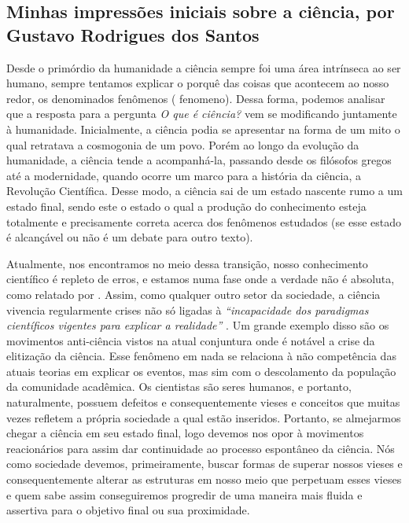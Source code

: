 \subsection{Minhas impressões iniciais sobre a ciência, por Gustavo Rodrigues dos Santos}

Desde o primórdio da humanidade a ciência sempre foi uma área intrínseca ao ser humano, sempre tentamos explicar o porquê das coisas que acontecem ao nosso redor, os denominados fenômenos ( \gls{fenomeno}). Dessa forma, podemos analisar que a resposta para a pergunta \textit{O que é ciência?} vem se modificando juntamente à humanidade. Inicialmente, a ciência podia se apresentar na forma de um mito o qual retratava a cosmogonia de um povo. Porém ao longo da evolução da humanidade, a ciência tende a acompanhá-la, passando desde os filósofos gregos até a modernidade, quando ocorre um marco para a história da ciência, a Revolução Científica. Desse modo, a ciência sai de um estado nascente rumo a um estado final, sendo este o estado o qual a produção do conhecimento esteja totalmente e precisamente correta acerca dos fenômenos estudados (se esse estado é alcançável ou não é um debate para outro texto).

Atualmente, nos encontramos no meio dessa transição, nosso conhecimento científico é repleto de erros, e estamos numa fase onde a verdade não é absoluta, como relatado por \citet{fernandes_consideracoes_2021}. Assim, como qualquer outro setor da sociedade, a ciência vivencia regularmente crises não só ligadas à \textit{``incapacidade dos paradigmas científicos vigentes para explicar a realidade''} \citep{fernandes_consideracoes_2021}. Um grande exemplo disso são os movimentos anti-ciência vistos na atual conjuntura onde é notável a crise da elitização da ciência. Esse fenômeno em nada se relaciona à não competência das atuais teorias em explicar os eventos, mas sim com o descolamento da população da comunidade acadêmica. Os cientistas são seres humanos, e portanto, naturalmente, possuem defeitos e consequentemente vieses e conceitos que muitas vezes refletem a própria sociedade a qual estão inseridos. Portanto, se almejarmos chegar a ciência em seu estado final, logo devemos nos opor à movimentos reacionários para assim dar continuidade ao processo espontâneo da ciência. Nós como sociedade devemos, primeiramente, buscar formas de superar nossos vieses e consequentemente alterar as estruturas em nosso meio que perpetuam esses vieses e quem sabe assim conseguiremos progredir de uma maneira mais fluida e assertiva para o objetivo final ou sua proximidade.
